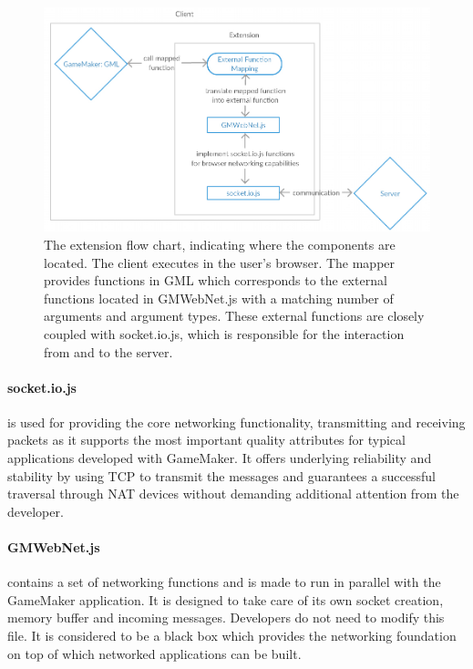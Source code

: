 \documentclass[bsc, 12pt, twoside, singlespacing, parskip, abbrevs, notimes, normalheadings, logo]{styles/infthesis}
\begin{document}
\begin{figure}[H]
\includegraphics[scale=0.42]{images/extension_flow.jpg}
\caption{The extension flow chart, indicating where the components are located. The client executes in the user's browser. The mapper provides functions in GML which corresponds to the external functions located in GMWebNet.js with a matching number of arguments and argument types. These external functions are closely coupled with socket.io.js, which is responsible for the interaction from and to the server.}
\label{fig:extension_flow}
\vspace{1em}
\end{figure}


\paragraph*{socket.io.js}
is used for providing the core networking functionality, transmitting and receiving packets as it supports the most important quality attributes for typical applications developed with GameMaker. It offers underlying reliability and stability by using TCP to transmit the messages and guarantees a successful traversal through NAT devices without demanding additional attention from the developer.

\paragraph*{GMWebNet.js}
contains a set of networking functions and is made to run in parallel with the GameMaker application. 
It is designed to take care of its own socket creation, memory buffer and incoming messages. Developers do not need to modify this file. It is considered to be a black box which provides the networking foundation on top of which networked applications can be built.
\end{document}
